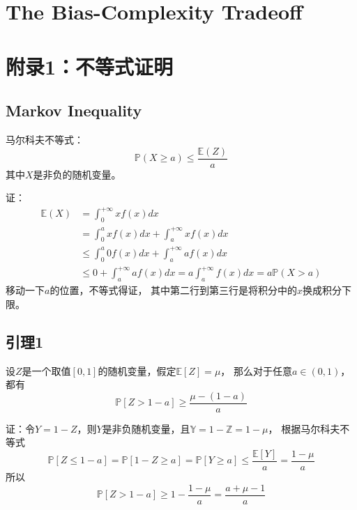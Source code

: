 \documentclass[UTF8]{ctexart}
\begin{document}
\newpage


%
%
\section{The Bias-Complexity Tradeoff}







\newpage



%
%

\section{附录1：不等式证明}
\subsection{Markov Inequality}
马尔科夫不等式：
$$
\mathbb{P}(X\geq a)\leq \frac{\mathbb{E}(Z)}{a}
$$
其中$X$是非负的随机变量。

证：
$$
\begin{aligned}
\mathbb{E}(X) &=  \int_0^{+\infty}{xf(x)dx} \\
	&= \int_0^{a}{xf(x)dx} + \int_a^{+\infty}{xf(x)dx} \\
	&\leq 
	\int_0^{a}{0f(x)dx} + \int_a^{+\infty}{af(x)dx}\\
	&\leq 0 + \int_a^{+\infty}{af(x)dx} 
   = a\int_a^{+\infty}{f(x)dx} = a\mathbb{P}(X>a)
\end{aligned}
$$
移动一下$a$的位置，不等式得证，
其中第二行到第三行是将积分中的$x$换成积分下限。

\subsection{引理1}

设$Z$是一个取值$[0,1]$的随机变量，假定$\mathbb{E}[Z]=\mu$，
那么对于任意$a\in (0,1)$，都有
$$
\mathbb{P}[Z>1-a]\geq\frac{\mu-(1-a)}{a}
$$

证：令$Y=1-Z$，则$Y$是非负随机变量，且$\mathbb{Y}=1-\mathbb{Z}=1-\mu$，
根据马尔科夫不等式
$$
\mathbb{P}[Z\leq 1-a]=
\mathbb{P}[1-Z\geq a]=
\mathbb{P}[Y\geq a]\leq \frac{\mathbb{E}[Y]}{a}=\frac{1-\mu}{a}
$$
所以
$$
\mathbb{P}[Z>1-a]\geq 1-\frac{1-\mu}{a} = \frac{a+\mu-1}{a}
$$
\end{document}
